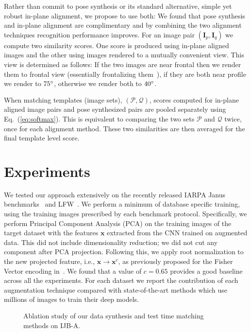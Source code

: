 \documentclass[runningheads]{llncs}
\def\mbf#1{\mathbf{#1}}
\begin{document}
Rather than commit to pose synthesis or its standard alternative, simple yet robust in-plane alignment, we propose to use both: We found that pose synthesis and in-plane alignment are complimentary and by combining the two alignment techniques recognition performance improves. For an image pair $(\mbf{I}_p, \mbf{I}_q)$ we compute two similarity scores. One score is produced using in-plane aligned images and the other using images rendered to a mutually convenient view. This view is determined as follows: If the two images are near frontal then we render them to frontal view (essentially frontalizing them~\cite{hassner2015effective}), if they are both near profile we render to $75\degree$, otherwise we render both to $40\degree$.


When matching templates (image sets), $(\mathcal{P}, \mathcal{Q})$, scores computed for in-plane aligned image pairs and pose synthesized pairs are pooled separately using Eq.~(\ref{eq:softmax}). This is equivalent to comparing the two sets $\mathcal{P}$ and $\mathcal{Q}$ twice, once for each alignment method. These two similarities are then averaged for the final template level score.



\section{Experiments}\label{sec:experiments}
We tested our approach extensively on the recently released IARPA Janus benchmarks~\cite{klare2015pushing} and LFW~\cite{LFWTech}. We perform a minimum of database specific  training, using the training images prescribed by each benchmark protocol. Specifically, we perform Principal Component Analysis (PCA) on the training images of the target dataset with the features $\mbf{x}$ extracted from the CNN trained on augmented data. This did not include dimensionality reduction; we did not cut any component after PCA projection. Following this, we apply root normalization to the new projected feature, i.e., $\mbf{x} \rightarrow  \mbf{x}^c$, as previously proposed for the Fisher Vector encoding in~\cite{sanchez2013image}. We found that a value of $c=0.65$ provides a good baseline across all the experiments.
For each dataset we report the contribution of each augmentation technique compared with state-of-the-art methods which use millions of images to train their deep models.
\begin{figure}[t]
\centering
{}
\caption{Ablation study of our data synthesis and test time matching methods on IJB-A.}
\label{fig:ijba-ablation}
\vspace{-3mm}
\end{figure}
\end{document}
